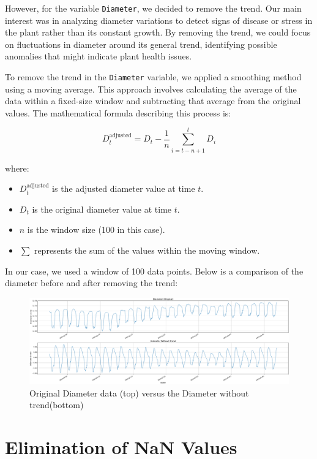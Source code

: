 However, for the variable \texttt{Diameter}, we decided to remove the trend. Our main interest was in analyzing diameter variations to detect signs of disease or stress in the plant rather than its constant growth. By removing the trend, we could focus on fluctuations in diameter around its general trend, identifying possible anomalies that might indicate plant health issues.

To remove the trend in the \texttt{Diameter} variable, we applied a smoothing method using a moving average. This approach involves calculating the average of the data within a fixed-size window and subtracting that average from the original values. The mathematical formula describing this process is:

\[
D_t^{\text{adjusted}} = D_t - \frac{1}{n} \sum_{i=t-n+1}^{t} D_i
\]

where:
\begin{itemize}
    \item $D_t^{\text{adjusted}}$ is the adjusted diameter value at time $t$.
    \item $D_t$ is the original diameter value at time $t$.
    \item $n$ is the window size (100 in this case).
    \item $\sum$ represents the sum of the values within the moving window.
\end{itemize}

In our case, we used a window of 100 data points. Below is a comparison of the diameter before and after removing the trend:

\begin{figure}[htbp]
    \centering
    \includegraphics[width=15 cm]{5_ChapterDesign/figuras/3_Trend/WithoutTrend_Diameter}
    \caption{Original Diameter data (top) versus the Diameter without trend(bottom)}
\end{figure}


\section{Elimination of NaN Values}

